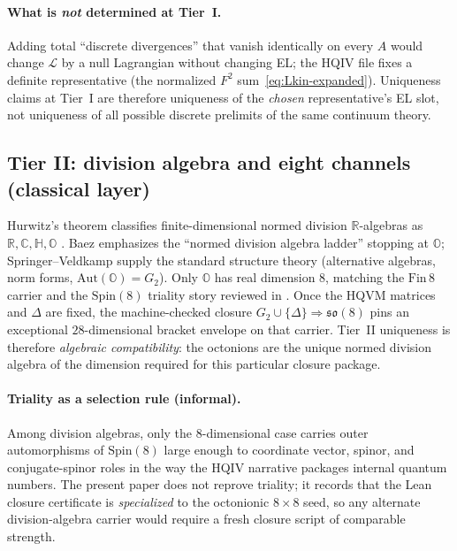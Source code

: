 \documentclass[11pt]{amsart}
\begin{document}
\paragraph{What is \emph{not} determined at Tier~I.}
Adding total ``discrete divergences'' that vanish identically on every \(A\) would change \(\mathcal{L}\) by a null Lagrangian without changing EL; the HQIV file fixes a definite representative (the normalized \(F^2\) sum~\eqref{eq:Lkin-expanded}). Uniqueness claims at Tier~I are therefore uniqueness of the \emph{chosen} representative's EL slot, not uniqueness of all possible discrete prelimits of the same continuum theory.

\subsection{Tier II: division algebra and eight channels (classical layer)}

Hurwitz's theorem classifies finite-dimensional normed division \(\mathbb{R}\)-algebras as \(\mathbb{R},\mathbb{C},\mathbb{H},\mathbb{O}\) \cite{baez2002,springer2000}. Baez emphasizes the ``normed division algebra ladder'' stopping at \(\mathbb{O}\); Springer--Veldkamp supply the standard structure theory (alternative algebras, norm forms, \(\mathrm{Aut}(\mathbb{O})=G_2\)). Only \(\mathbb{O}\) has real dimension \(8\), matching the \(\mathrm{Fin}\,8\) carrier and the \(\mathrm{Spin}(8)\) triality story reviewed in \cite{hqiv-3d-growth-paper}. Once the HQVM matrices and \(\Delta\) are fixed, the machine-checked closure \(G_2\cup\{\Delta\}\Rightarrow\mathfrak{so}(8)\) \cite{hqiv-so8-paper} pins an exceptional \(28\)-dimensional bracket envelope on that carrier. Tier~II uniqueness is therefore \emph{algebraic compatibility}: the octonions are the unique normed division algebra of the dimension required for this particular closure package.

\paragraph{Triality as a selection rule (informal).}
Among division algebras, only the \(8\)-dimensional case carries outer automorphisms of \(\mathrm{Spin}(8)\) large enough to coordinate vector, spinor, and conjugate-spinor roles in the way the HQIV narrative packages internal quantum numbers. The present paper does not reprove triality; it records that the Lean closure certificate is \emph{specialized} to the octonionic \(8\times 8\) seed, so any alternate division-algebra carrier would require a fresh closure script of comparable strength.
\end{document}

